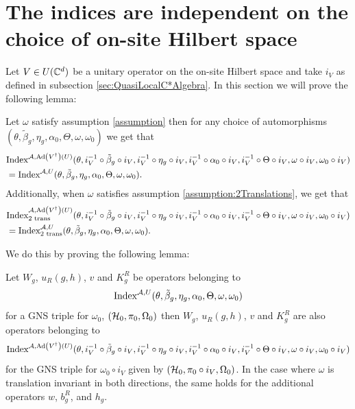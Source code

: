 \documentclass[11pt,a4paper,twoside]{article}
\numberwithin{equation}{section}
\begin{document}
	\section{The indices are independent on the choice of on-site Hilbert space}\label{sec:the-indices-are-independent-on-the-choice-of-on-site-hilbert-space}
	Let $V \in U(\CC^d)$ be a unitary operator on the on-site Hilbert space and take $i_V$ as defined in subsection \ref{sec:QuasiLocalC*Algebra}. In this section we will prove the following lemma:
	\begin{lemma}\label{lem:IndependenceOnChoiceOnSitHilbertSpace}
		Let $\omega$ satisfy assumption \ref{assumption} then for any choice of automorphisms $(\theta,\tilde{\beta}_g,\eta_g,\alpha_0,\Theta,\omega,\omega_0)$ we get that
		\begin{align}
			&\textrm{Index}^{\AA,\Ad{V^\dagger}(U)}(\theta,i_V^{-1}\circ\tilde{\beta}_g\circ i_V,i_V^{-1}\circ\eta_g\circ i_V,i_V^{-1}\circ\alpha_0\circ i_V,i_V^{-1}\circ\Theta\circ i_V,\omega\circ i_V,\omega_0\circ i_V)\\
			&=\textrm{Index}^{\AA,U}(\theta,\tilde{\beta}_g,\eta_g,\alpha_0,\Theta,\omega,\omega_0).
		\end{align}
		Additionally, when $\omega$ satisfies assumption \ref{assumption:2Translations}, we get that
		\begin{align}
			&\textrm{Index}^{\AA,\Ad{V^\dagger}(U)}_{\textrm{2 trans}}(\theta,i_V^{-1}\circ\tilde{\beta}_g\circ i_V,i_V^{-1}\circ\eta_g\circ i_V,i_V^{-1}\circ\alpha_0\circ i_V,i_V^{-1}\circ\Theta\circ i_V,\omega\circ i_V,\omega_0\circ i_V)\\
			&=\textrm{Index}^{\AA,U}_{\textrm{2 trans}}(\theta,\tilde{\beta}_g,\eta_g,\alpha_0,\Theta,\omega,\omega_0).
		\end{align}
	\end{lemma}
	We do this by proving the following lemma:
	\begin{lemma}\label{lem:IndependenceOnChoiceOnSitHilbertSpaceOperatorsBelongingTo}
		Let $W_g$, $u_R(g,h)$, $v$ and $K^R_g$ be operators belonging to
		\begin{equation}
			\textrm{Index}^{\AA,U}(\theta,\tilde{\beta}_g,\eta_g,\alpha_0,\Theta,\omega,\omega_0)
		\end{equation}
		for a GNS triple for $\omega_0$, $(\HH_0,\pi_0,\Omega_0)$ then $W_g$, $u_R(g,h)$, $v$ and $K^R_g$ are also operators belonging to
		\begin{equation}
			\textrm{Index}^{\AA,\Ad{V^\dagger}(U)}(\theta,i_V^{-1}\circ\tilde{\beta}_g\circ i_V,i_V^{-1}\circ\eta_g\circ i_V,i_V^{-1}\circ\alpha_0\circ i_V,i_V^{-1}\circ\Theta\circ i_V,\omega\circ i_V,\omega_0\circ i_V)
		\end{equation}
		for the GNS triple for $\omega_0\circ i_V$ given by $(\HH_0,\pi_0\circ i_V,\Omega_0)$. In the case where $\omega$ is translation invariant in both directions, the same holds for the additional operators $w$, $b_g^R$, and $h_g$.
	\end{lemma}
\end{document}
